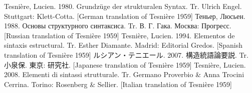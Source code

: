 %
Tesnière, Lucien. 1980. Grundzüge der strukturalen Syntax. Tr. Ulrich Engel. Stuttgart: Klett-Cotta. [German translation of Tesnière 1959]
Теньер, Люсьен. 1988. Основы структурного синтаксиса. Tr.  В. Г. Гака. Москва: Прогресс. [Russian translation of Tesnière 1959]
Tesnière, Lucien. 1994. Elementos de sintaxis estructural. Tr. Esther Diamante. Madrid: Editorial Gredos. [Spanish translation of Tesnière 1959]
ルシアン・テニエール. 2007. 構造統語論要説. Tr. 小泉保. 東京: 研究社. [Japanese translation of Tesnière 1959]
Tesnière, Lucien. 2008. Elementi di sintassi strutturale. Tr. Germano Proverbio & Anna Trocini Cerrina. Torino: Rosenberg & Sellier. [Italian translation of Tesnière 1959]
%
\fi
%


